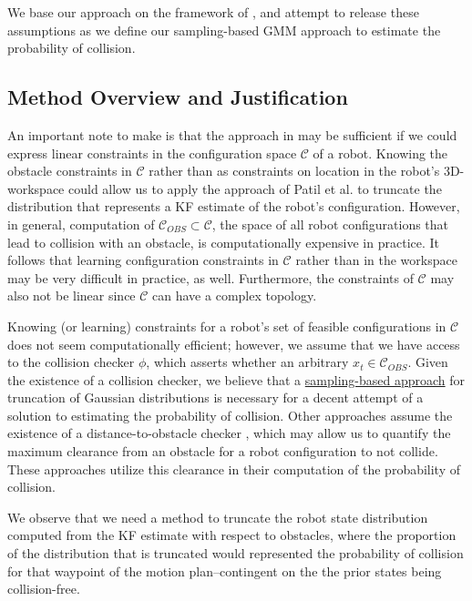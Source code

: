 \documentclass[journal]{IEEEtran}
\begin{document}
We base our approach on the framework of \cite{IEEEhowto:patil}, and attempt to release these assumptions as we define our sampling-based GMM approach to estimate the probability of collision.

\subsection{Method Overview and Justification}

An important note to make is that the approach in \cite{IEEEhowto:patil} may be sufficient if we could express linear constraints in the configuration space $\mathcal{C}$ of a robot. Knowing the obstacle constraints in  $\mathcal{C}$ rather than as constraints on location in the robot's 3D-workspace could allow us to apply the approach of Patil et al. to truncate the distribution that represents a KF estimate of the robot's configuration. However, in general, computation of $\mathcal{C}_{OBS} \subset \mathcal{C}$, the space of all robot configurations that lead to collision with an obstacle, is computationally expensive in practice. It follows that learning configuration constraints in $\mathcal{C}$ rather than in the workspace may be very difficult in practice, as well. Furthermore, the constraints of $\mathcal{C}$ may also not be linear since $\mathcal{C}$ can have a complex topology.

Knowing (or learning) constraints for a robot's set of feasible configurations in $\mathcal{C}$ does not seem computationally efficient; however, we assume that we have access to the collision checker $\phi$, which asserts whether an arbitrary $x_t \in \mathcal{C}_{OBS}$. Given the existence of a collision checker, we believe that a \underline{sampling-based approach} for truncation of Gaussian distributions is necessary for a decent attempt of a solution to estimating the probability of collision. Other approaches assume the existence of a distance-to-obstacle checker \cite{IEEEhowto:van_den_berg}, which may allow us to quantify the maximum clearance from an obstacle for a robot configuration to not collide. These approaches utilize this clearance in their computation of the probability of collision.

We observe that we need a method to truncate the robot state distribution computed from the KF estimate with respect to obstacles, where the proportion of the distribution that is truncated would represented the probability of collision for that waypoint of the motion plan--contingent on the the prior states being collision-free.
\end{document}
